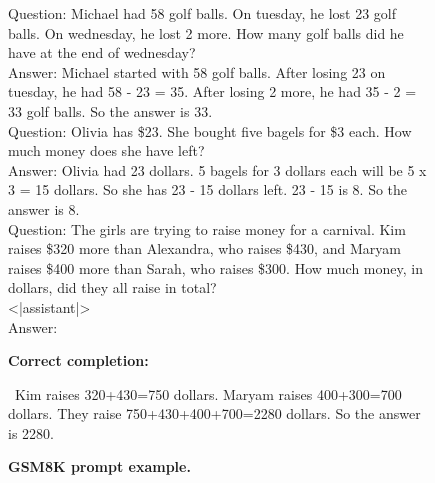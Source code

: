 \documentclass{article}
\begin{document}
\begin{figure}[htbp]
Question: Michael had 58 golf balls. On tuesday, he lost 23 golf balls. On wednesday, he lost 2 more. How many golf balls did he have at the end of wednesday?\\
Answer: Michael started with 58 golf balls. After losing 23 on tuesday, he had 58 - 23 = 35. After losing 2 more, he had 35 - 2 = 33 golf balls. So the answer is 33.\\

Question: Olivia has \$23. She bought five bagels for \$3 each. How much money does she have left?\\
Answer: Olivia had 23 dollars. 5 bagels for 3 dollars each will be 5 x 3 = 15 dollars. So she has 23 - 15 dollars left. 23 - 15 is 8. So the answer is 8.\\

Question: The girls are trying to raise money for a carnival. Kim raises \$320 more than Alexandra, who raises \$430, and Maryam raises \$400 more than Sarah, who raises \$300. How much money, in dollars, did they all raise in total?\\
<|assistant|>\\
Answer:

\hrulefill

\textbf{Correct completion:}

\hrulefill

~Kim raises 320+430=750 dollars. Maryam raises 400+300=700 dollars. They raise 750+430+400+700=2280 dollars. So the answer is 2280.

\hrulefill

\caption{\textbf{GSM8K prompt example.}}
\label{fig:gsm}
\end{figure}
\end{document}
